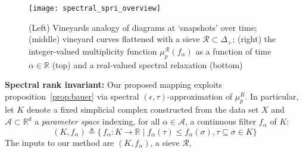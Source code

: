 \documentclass[10pt twocolumn]{article}
\numberwithin{equation}{section}
\newcommand{\+}{%
	\raisebox{0.18ex}{\scaleobj{0.55}{+}}
}
\theoremstyle{definition}
\theoremstyle{definition}
\begin{document}
\begin{figure}[t!]\label{fig:overview}
\centering
\texttt{[image: spectral\_spri\_overview]}	
\caption{ (Left) Vineyards analogy of diagrams at `snapshots' over time; 
(middle) vineyard curves flattened with a sieve $\mathcal{R} \subset \Delta_+$; 
(right) the integer-valued multiplicity function $\mu_p^{\mathcal{R}}(f_\alpha)$ 
as a function of time $\alpha \in \mathbb{R}$ (top) and a real-valued spectral relaxation (bottom)
}
\end{figure}

\begin{multicols}{2}
\noindent 
\textbf{Spectral rank invariant: }
Our proposed mapping exploits proposition~\ref{prop:bauer} via spectral $(\epsilon, \tau)$-approximation of $\mu_p^R$. 
In particular, let $K$ denote a fixed simplicial complex constructed from the data set $X$ and $\mathcal{A} \subset \mathbb{R}^d$ a \emph{parameter space} indexing, for all $\alpha \in \mathcal{A}$, a continuous filter $f_\alpha$ of $K$:
	\begin{equation*}
		(K, f_\alpha) \triangleq \{ \, f_\alpha : K \to \mathbb{R} \mid f_\alpha(\tau) \leq f_\alpha(\sigma)  , \tau \subseteq \sigma \in K\}
	\end{equation*}
The inputs to our method are $(K, f_\alpha)$, a sieve $\mathcal{R}$, 

\end{multicols}
\end{document}
